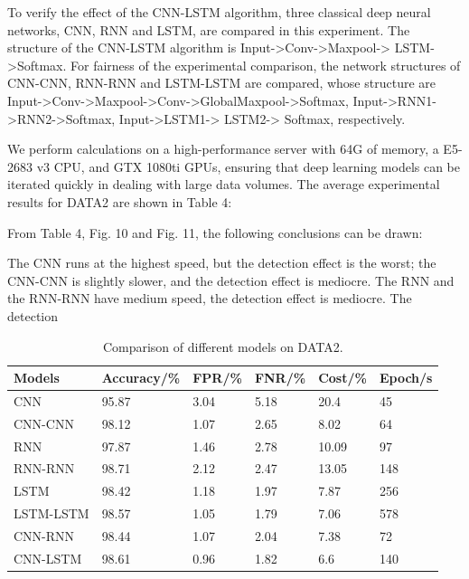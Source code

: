 \documentclass{ieeeaccess}
\begin{document}
\par To verify the effect of the CNN-LSTM algorithm, three
classical deep neural networks, CNN, RNN and LSTM,
are compared in this experiment. The structure of the
CNN-LSTM algorithm is Input->Conv->Maxpool->
LSTM->Softmax. For fairness of the experimental comparison, the network structures of CNN-CNN, RNN-RNN and LSTM-LSTM are compared, whose structure are Input->Conv->Maxpool->Conv->GlobalMaxpool->Softmax, Input->RNN1->RNN2->Softmax, Input->LSTM1-> LSTM2-> Softmax, respectively.
\par We perform calculations on a high-performance server with 64G of memory, a E5-2683 v3 CPU, and GTX 1080ti GPUs, ensuring that deep learning models can be iterated quickly in dealing with large data volumes. The average experimental results for DATA2 are shown in Table 4:
\par From Table 4, Fig. 10 and Fig. 11, the following conclusions can be drawn:
\par The CNN runs at the highest speed, but the detection effect is the worst; the CNN-CNN is slightly slower, and the detection effect is mediocre. The RNN and the RNN-RNN have medium speed, the detection effect is mediocre. The detection

\begin{table}[htp]
\caption{Comparison of different models on DATA2.}
\label{table:4}
\begin{tabular}{llllll}
\hline
Models    & Accuracy/\% & FPR/\% & FNR/\% & Cost/\% & Epoch/s \\ \hline
CNN       & 95.87       & 3.04   & 5.18   & 20.4    & 45      \\
CNN-CNN   & 98.12       & 1.07   & 2.65   & 8.02    & 64      \\
RNN       & 97.87       & 1.46   & 2.78   & 10.09   & 97      \\
RNN-RNN   & 98.71       & 2.12   & 2.47   & 13.05   & 148     \\
LSTM      & 98.42       & 1.18   & 1.97   & 7.87    & 256     \\
LSTM-LSTM & 98.57       & 1.05   & 1.79   & 7.06    & 578     \\
CNN-RNN   & 98.44       & 1.07   & 2.04   & 7.38    & 72      \\
CNN-LSTM  & 98.61       & 0.96   & 1.82   & 6.6     & 140     \\ \hline
\end{tabular}
\end{table}
\end{document}
